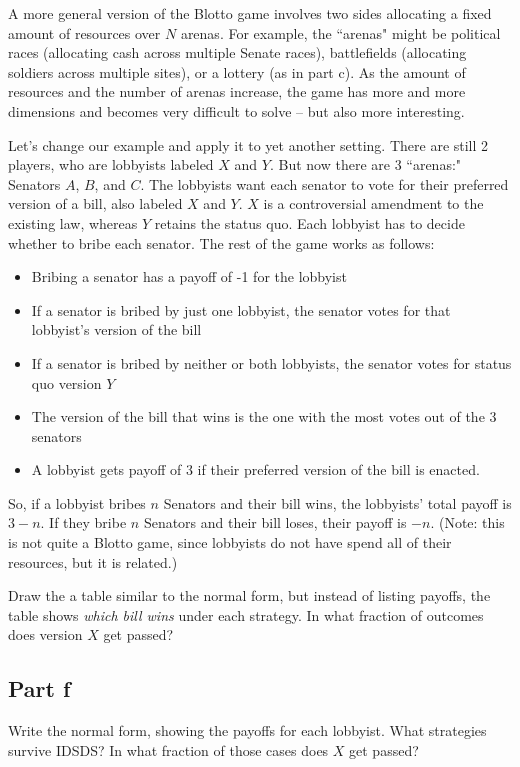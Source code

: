 \documentclass[10pt]{article}
\begin{document}
A more general version of the Blotto game involves two sides allocating a fixed amount of resources over $N$ arenas. For example, the ``arenas" might be political races (allocating cash across multiple Senate races), battlefields (allocating soldiers across multiple sites), or a lottery (as in part c). As the amount of resources and the number of arenas increase, the game has more and more dimensions and becomes very difficult to solve -- but also more interesting.

Let's change our example and apply it to yet another setting. There are still 2 players, who are lobbyists labeled $X$ and $Y$. But now there are 3 ``arenas:" Senators $A$, $B$, and $C$. The lobbyists want each senator to vote for their preferred version of a bill, also labeled $X$ and $Y$. $X$ is a controversial amendment to the existing law, whereas $Y$ retains the status quo. Each lobbyist has to decide whether to bribe each senator. The rest of the game works as follows:
\begin{itemize}
\item Bribing a senator has a payoff of -1 for the lobbyist
\item If a senator is bribed by just one lobbyist, the senator votes for that lobbyist's version of the bill
\item If a senator is bribed by neither or both lobbyists, the senator votes for status quo version $Y$
\item The version of the bill that wins is the one with the most votes out of the 3 senators
\item A lobbyist gets payoff of 3 if their preferred version of the bill is enacted.
\end{itemize}
So, if a lobbyist bribes $n$ Senators and their bill wins, the lobbyists' total payoff is $3-n$. If they bribe $n$ Senators and their bill loses, their payoff is $-n$. (Note: this is not quite a Blotto game, since lobbyists do not have spend all of their resources, but it is related.)

Draw the a table similar to the normal form, but instead of listing payoffs, the table shows \emph{which bill wins} under each strategy. In what fraction of outcomes does version $X$ get passed?

\newpage

\subsection*{Part f} Write the normal form, showing the payoffs for each lobbyist. What strategies survive IDSDS? In what fraction of those cases does $X$ get passed?
\end{document}
